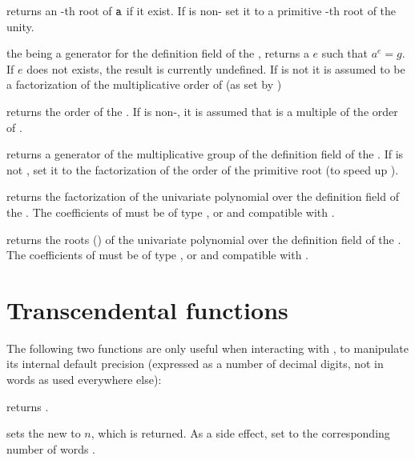  returns an -th root of
${\tt a}$ if it exist. If  is non- set it to a primitive
-th root of the unity.

 the   being a
generator for the definition field of the  , returns a
 $e$ such that $a^e=g$.  If $e$ does not exists, the result is
currently undefined. If  is not  it is assumed to be a
factorization of the multiplicative order of  (as set by
)

 returns the order of the  .
If  is non-, it is assumed that  is a multiple of the
order of .

 returns a generator of the
multiplicative group of the definition field of the  .
If  is not , set it to the factorization of the order
of the primitive root (to speed up ).

 returns the factorization of the univariate
polynomial  over the definition field of the  . The
coefficients of  must be of type ,  or 
and compatible with .

 returns the roots ()
of the univariate polynomial  over the definition field of the
 . The coefficients of  must be of type ,
 or  and compatible with .

\section{Transcendental functions}

The following two functions are only useful when interacting with ,
to manipulate its internal default precision (expressed as a number of
decimal digits, not in words as used everywhere else):

 returns .

 sets the new
 to $n$, which is returned. As a side effect, set
 to the corresponding number of words .


